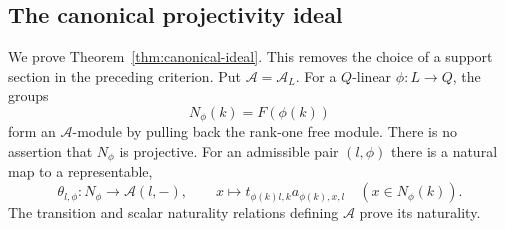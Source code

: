 \subsection{The canonical projectivity ideal}
\label{sec:canonical-ideal}
We prove Theorem~\ref{thm:canonical-ideal}. This removes the choice of a
support section in the preceding criterion. Put $\mathcal A=\mathcal A_L$.
For a $Q$-linear $\phi:L\to Q$, the groups
\[
 N_\phi(k)=F(\phi(k))
\]
form an $\mathcal A$-module by pulling back the rank-one free module.
There is no assertion that $N_\phi$ is projective. For an admissible
pair $(l,\phi)$ there is a natural map to a representable,
\[
 \theta_{l,\phi}:N_\phi\longrightarrow\mathcal A(l,-),\qquad
 x\longmapsto t_{\phi(k)l,k}a_{\phi(k),x,l}
 \quad(x\in N_\phi(k)).
\]
The transition and scalar naturality relations defining $\mathcal A$
prove its naturality.

